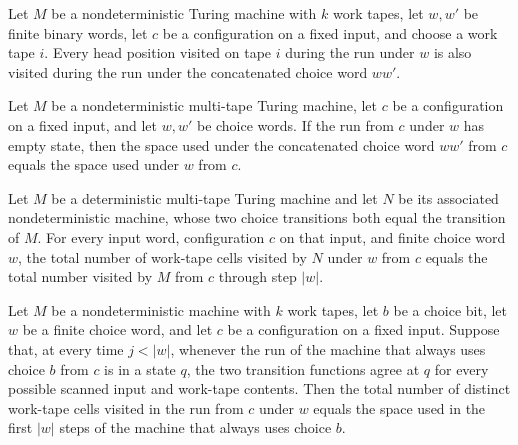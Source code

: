 \begin{lemma}
\label{Turing.NDTM.visitedWith_subset_append}
\leanok
{}
Let $M$ be a nondeterministic Turing machine with $k$ work tapes, let $w,w'$ be finite
binary words, let $c$ be a configuration on a fixed input, and choose a work tape $i$.
Every head position visited on tape $i$ during the run under $w$ is also visited during
the run under the concatenated choice word $ww'$.
\end{lemma}

\begin{theorem}
\label{Turing.NDTM.spaceUsedWith_append_of_halt}
\leanok
{}
Let $M$ be a nondeterministic multi-tape Turing machine, let $c$ be a configuration on a
fixed input, and let $w,w'$ be choice words. If the run from $c$ under $w$ has empty
state, then the space used under the concatenated choice word $ww'$ from $c$ equals the
space used under $w$ from $c$.
\end{theorem}

\begin{theorem}
\label{Turing.MultiTapeTM.toNDTM_spaceUsedWith}
\leanok
{}
Let $M$ be a deterministic multi-tape Turing machine and let $N$ be its associated
nondeterministic machine, whose two choice transitions both equal the transition of $M$.
For every input word, configuration $c$ on that input, and finite choice word $w$, the
total number of work-tape cells visited by $N$ under $w$ from $c$ equals the total
number visited by $M$ from $c$ through step $|w|$.
\end{theorem}

\begin{theorem}
\label{Turing.NDTM.spaceUsedWith_eq_fixChoice_spaceUsed}
\leanok
{}
Let $M$ be a nondeterministic machine with $k$ work tapes, let $b$ be a choice bit, let
$w$ be a finite choice word, and let $c$ be a configuration on a fixed input. Suppose
that, at every time $j<|w|$, whenever the run of the machine that always uses choice $b$
from $c$ is in a state $q$, the two transition functions agree at $q$ for every possible
scanned input and work-tape contents. Then the total number of distinct work-tape cells
visited in the run from $c$ under $w$ equals the space used in the first $|w|$ steps of
the machine that always uses choice $b$.
\end{theorem}

